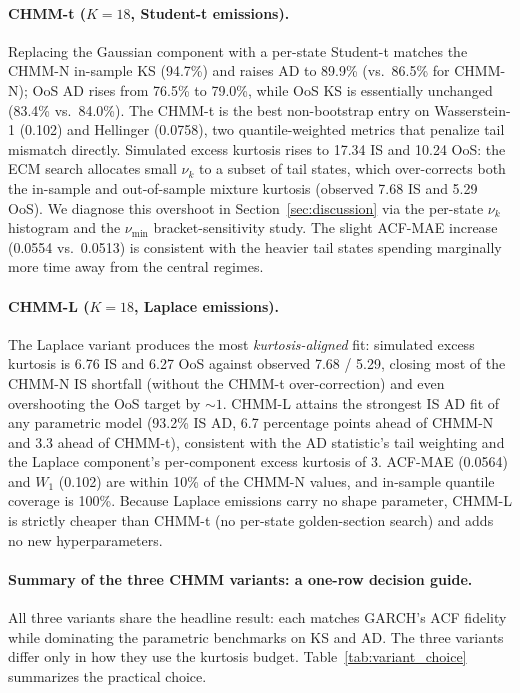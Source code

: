 \paragraph{CHMM-t ($K = 18$, Student-t emissions).}
Replacing the Gaussian component with a per-state Student-t matches the CHMM-N in-sample KS (94.7\%) and raises AD to 89.9\% (vs.\ 86.5\% for CHMM-N); OoS AD rises from 76.5\% to 79.0\%, while OoS KS is essentially unchanged (83.4\% vs.\ 84.0\%).
The CHMM-t is the best non-bootstrap entry on Wasserstein-1 (0.102) and Hellinger (0.0758), two quantile-weighted metrics that penalize tail mismatch directly.
Simulated excess kurtosis rises to 17.34 IS and 10.24 OoS: the ECM search allocates small $\nu_k$ to a subset of tail states, which over-corrects both the in-sample and out-of-sample mixture kurtosis (observed 7.68 IS and 5.29 OoS).
We diagnose this overshoot in Section~\ref{sec:discussion} via the per-state $\nu_k$ histogram and the $\nu_{\min}$ bracket-sensitivity study.
The slight ACF-MAE increase (0.0554 vs.\ 0.0513) is consistent with the heavier tail states spending marginally more time away from the central regimes.

\paragraph{CHMM-L ($K = 18$, Laplace emissions).}
The Laplace variant produces the most \emph{kurtosis-aligned} fit: simulated excess kurtosis is 6.76 IS and 6.27 OoS against observed 7.68 / 5.29, closing most of the CHMM-N IS shortfall (without the CHMM-t over-correction) and even overshooting the OoS target by $\sim 1$.
CHMM-L attains the strongest IS AD fit of any parametric model (93.2\% IS AD, 6.7 percentage points ahead of CHMM-N and 3.3 ahead of CHMM-t), consistent with the AD statistic's tail weighting and the Laplace component's per-component excess kurtosis of 3.
ACF-MAE (0.0564) and $W_1$ (0.102) are within 10\% of the CHMM-N values, and in-sample quantile coverage is 100\%.
Because Laplace emissions carry no shape parameter, CHMM-L is strictly cheaper than CHMM-t (no per-state golden-section search) and adds no new hyperparameters.

\paragraph{Summary of the three CHMM variants: a one-row decision guide.}
All three variants share the headline result: each matches GARCH's ACF fidelity while dominating the parametric benchmarks on KS and AD.
The three variants differ only in how they use the kurtosis budget.
Table~\ref{tab:variant_choice} summarizes the practical choice.

